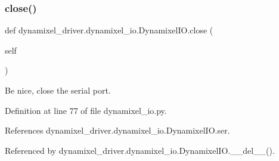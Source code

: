 \mbox{\label{classdynamixel__driver_1_1dynamixel__io_1_1_dynamixel_i_o_a4cdcd3496e76197fc4d5f23ccd7daf26}} 
\subsubsection{\texorpdfstring{close()}{close()}}
{\footnotesize\ttfamily def dynamixel\+\_\+driver.\+dynamixel\+\_\+io.\+Dynamixel\+I\+O.\+close (\begin{DoxyParamCaption}\item[{}]{self }\end{DoxyParamCaption})}

\begin{DoxyVerb}Be nice, close the serial port.
\end{DoxyVerb}
 

Definition at line 77 of file dynamixel\+\_\+io.\+py.



References dynamixel\+\_\+driver.\+dynamixel\+\_\+io.\+Dynamixel\+I\+O.\+ser.



Referenced by dynamixel\+\_\+driver.\+dynamixel\+\_\+io.\+Dynamixel\+I\+O.\+\_\+\+\_\+del\+\_\+\+\_\+().


